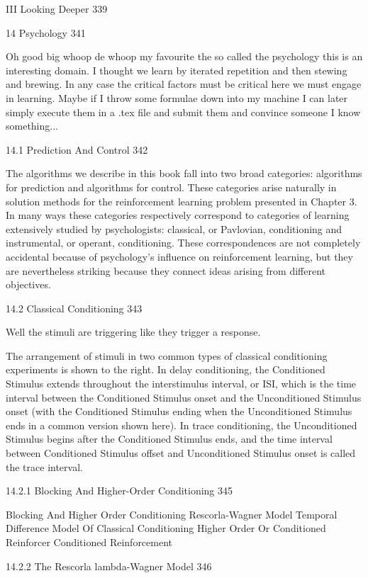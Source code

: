 III Looking Deeper 339



14 Psychology 341

Oh good big whoop de whoop my favourite the so called the psychology this is an interesting domain. I thought we learn by iterated repetition and then stewing and brewing. In any case the critical factors must be critical here we must engage in learning. Maybe if I throw some formulae down into my machine I can later simply execute them in a .tex file and submit them and convince someone I know something...

14.1 Prediction And Control 342

The algorithms we describe in this book fall into two broad categories: algorithms for prediction and algorithms for control. These categories arise naturally in solution methods for the reinforcement learning problem presented in Chapter 3. In many ways these categories respectively correspond to categories of learning extensively studied by psychologists: classical, or Pavlovian, conditioning and instrumental, or operant, conditioning. These correspondences are not completely accidental because of psychology's influence on reinforcement learning, but they are nevertheless striking because they connect ideas arising from different objectives.

14.2 Classical Conditioning 343

Well the stimuli are triggering like they trigger a response.

The arrangement of stimuli in two common types of classical conditioning experiments is shown to the right. In delay conditioning, the Conditioned Stimulus extends throughout the interstimulus interval, or ISI, which is the time interval between the Conditioned Stimulus onset and the Unconditioned Stimulus onset (with the Conditioned Stimulus ending when the Unconditioned Stimulus ends in a common version shown here). In trace conditioning, the Unconditioned Stimulus begins after the Conditioned Stimulus ends, and the time interval between Conditioned Stimulus offset and Unconditioned Stimulus onset is called the trace interval.

14.2.1 Blocking And Higher-Order Conditioning 345

Blocking And Higher Order Conditioning
Rescorla-Wagner Model
Temporal Difference Model Of Classical Conditioning
Higher Order Or Conditioned Reinforcer
Conditioned Reinforcement

14.2.2 The Rescorla lambda-Wagner Model 346

